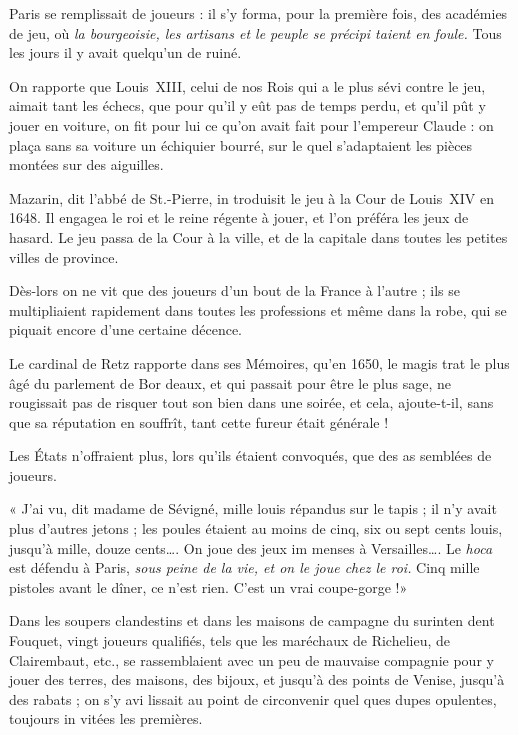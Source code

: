 Paris se remplissait de joueurs : il
s'y forma, pour la première fois, des
académies de jeu, où \emph{la bourgeoisie,
les artisans et le peuple se précipi%
taient en foule.} Tous les jours il y
avait quelqu'un de ruiné.

On rapporte que Louis~XIII, celui
de nos Rois qui a le plus sévi contre
le jeu, aimait tant les échecs, que
pour qu'il y eût pas de temps perdu,
et qu'il pût y jouer en voiture, on
fit pour lui ce qu'on avait fait pour
l'empereur Claude : on plaça sans sa
voiture un échiquier bourré, sur le%
quel s'adaptaient les pièces montées
sur des aiguilles.

Mazarin, dit l'abbé de St.-Pierre, in%
troduisit le jeu à la Cour de Louis~XIV
en 1648. Il engagea le roi et le reine
régente à jouer, et l'on préféra les jeux
de hasard. Le jeu passa de la Cour à la
ville, et de la capitale dans toutes les
petites villes de province.

Dès-lors on ne vit que des joueurs
d'un bout de la France à l'autre ; ils se
multipliaient rapidement dans toutes
les professions et même dans la robe,
qui se piquait encore d'une certaine
décence.

Le cardinal de Retz rapporte dans
ses Mémoires, qu'en 1650, le magis%
trat le plus âgé du parlement de Bor%
deaux, et qui passait pour être le plus
sage, ne rougissait pas de risquer tout
son bien dans une soirée, et cela,
ajoute-t-il, sans que sa réputation
en souffrît, tant cette fureur était
générale !

Les États n'offraient plus, lors%
qu'ils étaient convoqués, que des as%
semblées de joueurs.

« J'ai vu, dit madame de Sévigné,
mille louis répandus sur le tapis ; il
n'y avait plus d'autres jetons ; les
poules étaient au moins de cinq, six
ou sept cents louis, jusqu'à mille,
douze cents…. On joue des jeux im%
menses à Versailles…. Le \emph{hoca} est
défendu à Paris, \emph{sous peine de la
vie, et on le joue chez le roi.} Cinq
mille pistoles avant le dîner, ce n'est
rien. C'est un vrai coupe-gorge !»

Dans les soupers clandestins et dans
les maisons de campagne du surinten%
dent Fouquet, vingt joueurs qualifiés,
tels que les maréchaux de Richelieu,
de Clairembaut, etc., se rassemblaient
avec un peu de mauvaise compagnie
pour y jouer des terres, des maisons,
des bijoux, et jusqu'à des points de
Venise, jusqu'à des rabats ; on s'y avi%
lissait au point de circonvenir quel%
ques dupes opulentes, toujours in%
vitées les premières.

